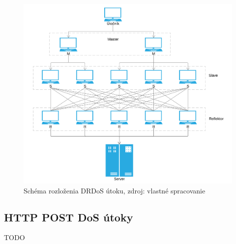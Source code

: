 \documentclass[
  printed, %
  table,   %
  lof,     %
  lot,     %
]{fithesis3}
\begin{document}
\begin{figure}[h]
  \centering
    \includegraphics[width=\textwidth]{images/drdos.png}
  \caption{Schéma rozloženia DRDoS útoku, zdroj: vlastné spracovanie}
  \label{fig:cs-basic}
\end{figure}


\subsection{HTTP POST DoS útoky}
TODO
\end{document}
